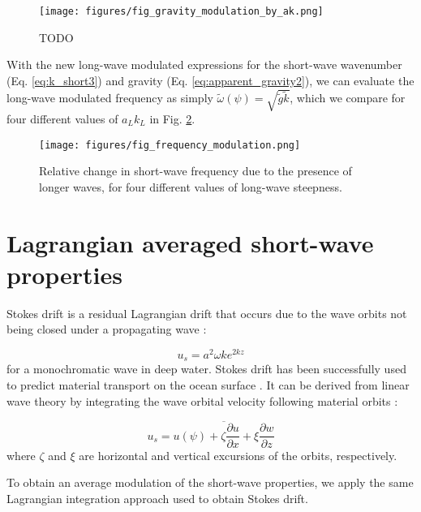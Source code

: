 \documentclass[draft]{agujournal2019}
\begin{document}
\begin{figure}[h]
\label{fig:gravity_modulation_vs_ak}
\centering
\texttt{[image: figures/fig\_gravity\_modulation\_by\_ak.png]}
\caption{
  TODO
}
\end{figure}

With the new long-wave modulated expressions for the short-wave wavenumber
(Eq. \ref{eq:k_short3}) and gravity (Eq. \ref{eq:apparent_gravity2}), we can
evaluate the long-wave modulated frequency as simply
$\widetilde{\omega}(\psi) = \sqrt{\widetilde{g} \widetilde{k}}$, which we compare
for four different values of $a_L k_L$ in Fig. \ref{fig:frequency_modulation}.

\begin{figure}[h]
\label{fig:frequency_modulation}
\centering
\texttt{[image: figures/fig\_frequency\_modulation.png]}
\caption{
  Relative change in short-wave frequency due to the presence of longer
  waves, for four different values of long-wave steepness.
}
\end{figure}

\section{Lagrangian averaged short-wave properties}

Stokes drift is a residual Lagrangian drift that occurs due to the wave orbits
not being closed under a propagating wave
\cite{stokes1847,kenyon1969stokes,van2018stokes}:

\begin{equation}
\label{}
u_s = a^2 \omega k e^{2kz}
\end{equation}
for a monochromatic wave in deep water.
Stokes drift has been successfully used to predict material transport on the
ocean surface \cite{rohrs2012observation,curcic2016hurricane}.
It can be derived from linear wave theory by integrating the wave orbital
velocity following material orbits \cite{phillips1966dynamics}:

\begin{equation}
\label{eq:lagrangian_average}
u_s = \overline{
  u(\psi) + 
  \zeta \dfrac{\partial u}{\partial x} +
  \xi \dfrac{\partial w}{\partial z}
}
\end{equation}
where $\zeta$ and $\xi$ are horizontal and vertical excursions of the orbits,
respectively.

To obtain an average modulation of the short-wave properties, we apply the same
Lagrangian integration approach used to obtain Stokes drift.
\end{document}
